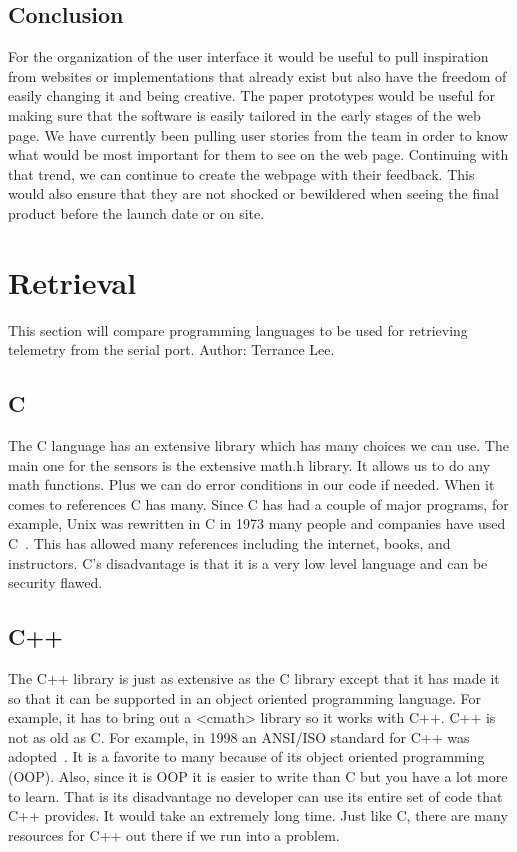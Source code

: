\documentclass[10pt,draftclsnofoot,onecolumn]{IEEEtran}
\begin{document}
	\subsection{Conclusion}
	For the organization of the user interface it would be useful to pull inspiration from websites or implementations
	that already exist but also have the freedom of easily changing it and being creative. 
	The paper prototypes would be useful for making sure that the software is easily tailored in the early stages of the 
	web page. 
	We have currently been pulling user stories from the team in order to know what would be most important for them to 
	see on the web page. 
	Continuing with that trend, we can continue to create the webpage with their feedback. 
	This would also ensure that they are not shocked or bewildered when seeing the final product before the launch date
	or on site.
	
	\section{Retrieval}
	This section will compare programming languages to be used for retrieving telemetry from the serial port. Author: Terrance Lee.
   	\subsection{C}
   	The C language has an extensive library which has many choices we can use. 
	The main one for the sensors is the extensive math.h library. 
	It allows us to do any math functions. Plus we can do error conditions in our code if needed. 
	When it comes to references C has many. 
	Since C has had a couple of major programs, for example, Unix was rewritten in C in 1973 many people and companies have
	used C~\cite{history-of-unix-part-i}.
	This has allowed many references including the internet, books, and instructors. C’s disadvantage is that it is a very low level language and can be security flawed.

	\subsection{C++}
   	The C++ library is just as extensive as the C library except that it has made it so that it can be supported in an
	object oriented programming language. 
	For example, it has to bring out a <cmath> library so it works with C++.
	C++ is not as old as C. For example, in 1998 an ANSI/ISO standard for C++ was adopted~\cite{c-programmers-reference}.
	It is a favorite to many because of its object oriented programming (OOP). 
	Also, since it is OOP it is easier to write than C but you have a lot more to learn. 
	That is its disadvantage no developer can use its entire set of code that C++ provides.
	It would take an extremely long time. Just like C, there are many resources for C++ out there if we run into a problem.
\end{document}
